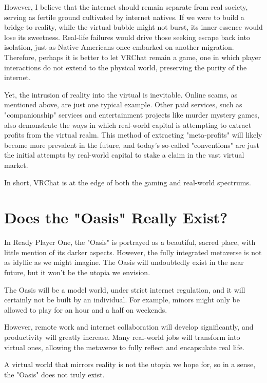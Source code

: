 \documentclass[]{article}
\begin{document}
	However, I believe that the internet should remain separate from real society, serving as fertile ground cultivated by internet natives. If we were to build a bridge to reality, while the virtual bubble might not burst, its inner essence would lose its sweetness. Real-life failures would drive those seeking escape back into isolation, just as Native Americans once embarked on another migration. Therefore, perhaps it is better to let VRChat remain a game, one in which player interactions do not extend to the physical world, preserving the purity of the internet.
	
	Yet, the intrusion of reality into the virtual is inevitable. Online scams, as mentioned above, are just one typical example. Other paid services, such as "companionship" services and entertainment projects like murder mystery games, also demonstrate the ways in which real-world capital is attempting to extract profits from the virtual realm. This method of extracting "meta-profits" will likely become more prevalent in the future, and today’s so-called "conventions" are just the initial attempts by real-world capital to stake a claim in the vast virtual market.
	
	In short, VRChat is at the edge of both the gaming and real-world spectrums.
	
	\section{Does the "Oasis" Really Exist?}
	In Ready Player One, the "Oasis" is portrayed as a beautiful, sacred place, with little mention of its darker aspects. However, the fully integrated metaverse is not as idyllic as we might imagine. The Oasis will undoubtedly exist in the near future, but it won’t be the utopia we envision.
	
	The Oasis will be a model world, under strict internet regulation, and it will certainly not be built by an individual. For example, minors might only be allowed to play for an hour and a half on weekends.
	
	However, remote work and internet collaboration will develop significantly, and productivity will greatly increase. Many real-world jobs will transform into virtual ones, allowing the metaverse to fully reflect and encapsulate real life.
	
	A virtual world that mirrors reality is not the utopia we hope for, so in a sense, the "Oasis" does not truly exist.
	
\end{document}
